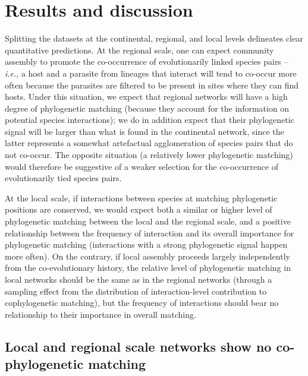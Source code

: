 \documentclass[12pt]{article}
\begin{document}
\section{Results and discussion}\label{results-and-discussion}

Splitting the datasets at the continental, regional, and local levels
delineates clear quantitative predictions. At the regional scale, one
can expect community assembly to promote the co-occurrence of
evolutionarily linked species pairs -- \emph{i.e.}, a host and a
parasite from lineages that interact will tend to co-occur more often
because the parasites are filtered to be present in sites where they can
find hosts. Under this situation, we expect that regional networks will
have a high degree of phylogenetic matching (because they account for
the information on potential species interactions); we do in addition
expect that their phylogenetic signal will be larger than what is found
in the continental network, since the latter represents a somewhat
artefactual agglomeration of species pairs that do not co-occur. The
opposite situation (a relatively lower phylogenetic matching) would
therefore be suggestive of a weaker selection for the co-occurrence of
evolutionarily tied species pairs.

At the local scale, if interactions between species at matching
phylogenetic positions are conserved, we would expect both a similar or
higher level of phylogenetic matching between the local and the regional
scale, and a positive relationship between the frequency of interaction
and its overall importance for phylogenetic matching (interactions with
a strong phylogenetic signal happen more often). On the contrary, if
local assembly proceeds largely independently from the co-evolutionary
history, the relative level of phylogenetic matching in local networks
should be the same as in the regional networks (through a sampling
effect from the distribution of interaction-level contribution to
cophylogenetic matching), but the frequency of interactions should bear
no relationship to their importance in overall matching.

\subsection{Local and regional scale networks show no co-phylogenetic
matching}\label{local-and-regional-scale-networks-show-no-co-phylogenetic-matching}
\end{document}
